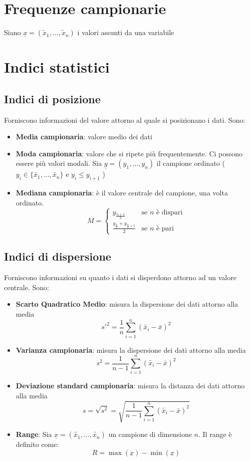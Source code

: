 \documentclass[a4paper]{article}
\theoremstyle{break}
\theoremstyle{break}
\theoremstyle{break}
\theoremstyle{break}
\begin{document}
\section{Frequenze campionarie}
Siano \( \underline{x} = (\tilde{x}_1, \ldots, \tilde{x}_n) \) i valori assunti da una variabile

\section{Indici statistici}
\subsection{Indici di posizione}
Forniscono informazioni del valore attorno al quale si posizionano i dati. Sono:
\begin{itemize}
	\item \textbf{Media campionaria}: valore medio dei dati
	\item \textbf{Moda campionaria}: valore che si ripete più frequentemente. Ci possono
	      essere più valori modali. Sia \( \underline{y} = (y_1, \ldots, y_n) \) il campione
	      ordinato (\( y_i \in \{\tilde{x_1}, \ldots, \tilde{x_n}\}  \) e \( y_i \le y_{i+1} \) )
	\item \textbf{Mediana campionaria}: è il valore centrale del campione, una volta ordinato.
	      \[
		      M = \begin{cases}
			      y_{\frac{n+1}{2}}                             & \text{se } n \text{ è dispari} \\
			      \frac{y_{\frac{n}{2}} + y_{\frac{n}{2}+1}}{2} & \text{se } n \text{ è pari}
		      \end{cases}
	      \]
\end{itemize}

\subsection{Indici di dispersione}
Forniscono informazioni su quanto i dati si disperdono attorno ad un valore centrale. Sono:
\begin{itemize}
	\item \textbf{Scarto Quadratico Medio}: misura la dispersione dei dati attorno alla media
	      \[
		      s'^2 = \frac{1}{n} \sum_{i=1}^{n} (\tilde{x_i} - \bar{x})^2
	      \]
	\item \textbf{Varianza campionaria}: misura la dispersione dei dati attorno alla media
	      \[
		      s^2 = \frac{1}{n-1} \sum_{i=1}^{n} (\tilde{x_i} - \bar{x})^2
	      \]
	\item \textbf{Deviazione standard campionaria}: misura la distanza dei dati attorno alla media
	      \[
		      s = \sqrt{s^2} = \sqrt{\frac{1}{n-1} \sum_{i=1}^{n} (\tilde{x_i} - \bar{x})^2}
	      \]
	\item \textbf{Range}: Sia \( \underline{x} = (\tilde{x_1}, \ldots, \tilde{x_n}) \) un campione
	      di dimensione \( n \). Il range è definito come:
	      \[
		      R = \max(\underline{x}) - \min(\underline{x})
	      \]
\end{itemize}
\end{document}
